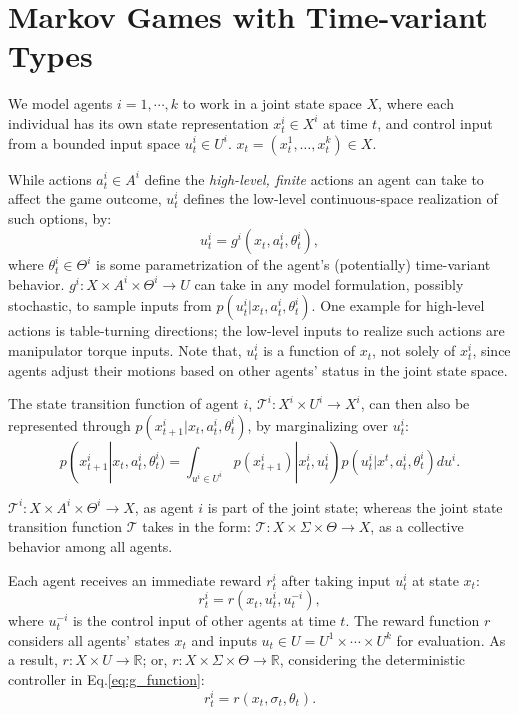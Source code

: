 \documentclass[letterpaper, 10 pt, conference]{ieeeconf}  %
\begin{document}
\section{Markov Games with Time-variant Types}
\vspace{-.2em}
We model agents $i = 1,\cdots ,k$ to work in a joint state space $X$, where each individual has its own state 
representation $x_t^i \in X^i$ at time $t$, and control input from a bounded 
input space $u_t^i \in U^i$. $x_t = (x^1_t,\ldots,x^k_t) \in X$.

While actions $a_t^i \in A^i$ define the \textit{high-level, finite} actions an 
agent can take to affect the game outcome, $u_t^i$ defines the low-level continuous-space
realization of such options, by:
\begin{equation}\label{eq:g_function}
  u_t^i = g^i(x_t, a^i_t, \theta^i_t),
\end{equation}
where $\theta^i_t \in \Theta^i$ is some parametrization of the agent's 
(potentially) time-variant behavior.
$g^i:X \times A^i \times \Theta^i \rightarrow U$ can take in any model 
formulation, 
possibly stochastic, to sample inputs from $p(u_t^i|x_t,a^i_t,\theta_t^i)$. 
One example for high-level actions is table-turning directions; the low-level 
inputs to realize such actions are manipulator torque inputs. 
Note that, $u_t^i$ is a function of $x_t$, not solely of $x^i_t$, since agents 
adjust their motions based on other agents' status in the joint state space. 

The state transition function of agent $i$, 
$\mathcal{T}^i:X^i \times U^i \rightarrow X^i$, can then also be represented 
through
$p(x^i_{t+1}|x_t,a^i_t,\theta^i_t)$, by marginalizing over $u^i_t$:
\begin{equation}
  p(x^i_{t+1}|x_t,a^i_t,\theta^i_t) = \int_{u^i \in U^i} 
  p(x_{t+1}^i)|x^i_t,u^i_t) p(u^i_t|x^t,a^i_t,\theta^i_t)du^i.
\end{equation}

$\mathcal{T}^i:X \times A^i \times \Theta^i \rightarrow X$, as agent $i$ is 
part of the joint state; whereas the joint 
state transition function $\mathcal{T}$ takes in the form: 
$\mathcal{T}:X \times \Sigma \times \Theta \rightarrow X$, as a collective 
behavior among all agents. 

Each agent receives an immediate reward $r^i_t$ 
after taking input $u_t^i$ at state $x_t$:
\begin{equation}\label{eq:r_control_input}
  r^i_t = r(x_t,u^i_t,u^{-i}_t),
\end{equation}
where $u^{-i}_t$ is the control input of other agents at time $t$. The reward 
function $r$ considers all agents' states $x_t$ and inputs 
$u_t \in U = U^1\times \cdots \times U^k$ for evaluation.
As a result, $r: X \times U \rightarrow \mathbb{R}$; or, 
$r: X\times \Sigma \times \Theta \rightarrow \mathbb{R}$, considering the 
deterministic controller in Eq.\ref{eq:g_function}:
\begin{equation}\label{eq:r_function}
  r^i_t = r(x_t,\sigma_t,\theta_t).
\end{equation}
\end{document}
